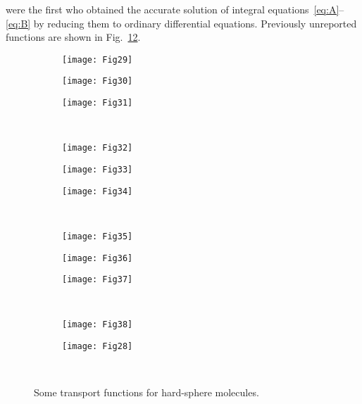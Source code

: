\documentclass[review]{elsarticle}
\begin{document}
\citet{Pekeris1957} were the first who obtained the accurate solution of integral equations~\eqref{eq:A}--\eqref{eq:B}
by reducing them to ordinary differential equations.
Previously unreported functions are shown in Fig.~\ref{fig:transport_functions}.

\begin{figure}
    \centering
    \begin{subfigure}[b]{0.33\textwidth}
        \texttt{[image: Fig29]}
        \label{fig:T1_1}
    \end{subfigure}%
    \begin{subfigure}[b]{0.33\textwidth}
        \texttt{[image: Fig30]}
        \label{fig:T1_2}
    \end{subfigure}%
    \begin{subfigure}[b]{0.33\textwidth}
        \texttt{[image: Fig31]}
        \label{fig:T2_1}
    \end{subfigure}\\[-6pt]
    \begin{subfigure}[b]{0.33\textwidth}
        \texttt{[image: Fig32]}
        \label{fig:T2_2}
    \end{subfigure}%
    \begin{subfigure}[b]{0.33\textwidth}
        \texttt{[image: Fig33]}
        \label{fig:TT12}
    \end{subfigure}%
    \begin{subfigure}[b]{0.33\textwidth}
        \texttt{[image: Fig34]}
        \label{fig:TT2}
    \end{subfigure}\\[-6pt]
    \begin{subfigure}[b]{0.33\textwidth}
        \texttt{[image: Fig35]}
        \label{fig:Q2}
    \end{subfigure}%
    \begin{subfigure}[b]{0.33\textwidth}
        \texttt{[image: Fig36]}
        \label{fig:Q3}
    \end{subfigure}%
    \begin{subfigure}[b]{0.33\textwidth}
        \texttt{[image: Fig37]}
        \label{fig:QQ22}
    \end{subfigure}\\[-6pt]
    \begin{subfigure}[b]{0.33\textwidth}
        \texttt{[image: Fig38]}
        \label{fig:QQ3}
    \end{subfigure}%
    \begin{subfigure}[b]{0.33\textwidth}
        \texttt{[image: Fig28]}
        \label{fig:B_4}
    \end{subfigure}\\[-6pt]
    \caption{Some transport functions for hard-sphere molecules.}
    \label{fig:transport_functions}
\end{figure}



\end{document}
